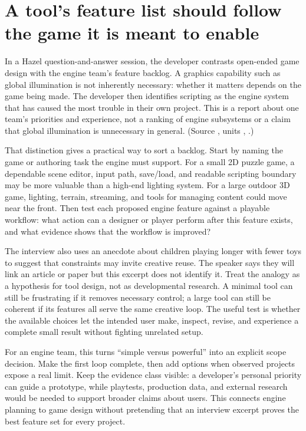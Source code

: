 \section{A tool's feature list should follow the game it is meant to enable}\label{06-engine-ii-ch047-a-tools-feature-list-should-follow-the-game-it-is-meant-to-enable}

\hypertarget{06-engine-ii-ch047-a-tools-feature-list-should-follow-the-game-it-is-meant-to-enable}{}

In a Hazel question-and-answer session, the developer contrasts open-ended game design with the engine team's feature backlog. A graphics capability such as global illumination is not inherently necessary: whether it matters depends on the game being made. The developer then identifies scripting as the engine system that has caused the most trouble in their own project. This is a report about one team's priorities and experience, not a ranking of engine subsystems or a claim that global illumination is unnecessary in general. (Source , units , .)

That distinction gives a practical way to sort a backlog. Start by naming the game or authoring task the engine must support. For a small 2D puzzle game, a dependable scene editor, input path, save/load, and readable scripting boundary may be more valuable than a high-end lighting system. For a large outdoor 3D game, lighting, terrain, streaming, and tools for managing content could move near the front. Then test each proposed engine feature against a playable workflow: what action can a designer or player perform after this feature exists, and what evidence shows that the workflow is improved?

The interview also uses an anecdote about children playing longer with fewer toys to suggest that constraints may invite creative reuse. The speaker says they will link an article or paper but this excerpt does not identify it. Treat the analogy as a hypothesis for tool design, not as developmental research. A minimal tool can still be frustrating if it removes necessary control; a large tool can still be coherent if its features all serve the same creative loop. The useful test is whether the available choices let the intended user make, inspect, revise, and experience a complete small result without fighting unrelated setup.

For an engine team, this turns ``simple versus powerful'' into an explicit scope decision. Make the first loop complete, then add options when observed projects expose a real limit. Keep the evidence class visible: a developer's personal priority can guide a prototype, while playtests, production data, and external research would be needed to support broader claims about users. This connects engine planning to game design without pretending that an interview excerpt proves the best feature set for every project.

